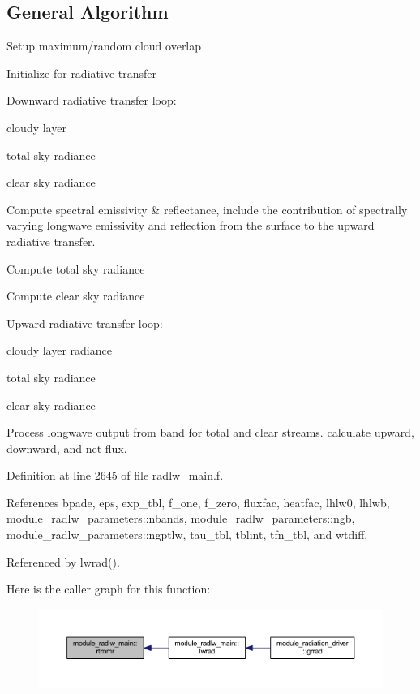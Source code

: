 \hypertarget{group__module__radsw__main_general}{}\subsection{General Algorithm}\label{group__module__radsw__main_general}

\begin{DoxyEnumerate}
\item Setup maximum/random cloud overlap
\item Initialize for radiative transfer
\item Downward radiative transfer loop\+:
\begin{DoxyItemize}
\item cloudy layer
\item total sky radiance
\item clear sky radiance
\end{DoxyItemize}
\item Compute spectral emissivity \& reflectance, include the contribution of spectrally varying longwave emissivity and reflection from the surface to the upward radiative transfer.
\item Compute total sky radiance
\item Compute clear sky radiance
\item Upward radiative transfer loop\+:
\begin{DoxyItemize}
\item cloudy layer radiance
\item total sky radiance
\item clear sky radiance
\end{DoxyItemize}
\item Process longwave output from band for total and clear streams. calculate upward, downward, and net flux. 
\end{DoxyEnumerate}

Definition at line 2645 of file radlw\+\_\+main.\+f.



References bpade, eps, exp\+\_\+tbl, f\+\_\+one, f\+\_\+zero, fluxfac, heatfac, lhlw0, lhlwb, module\+\_\+radlw\+\_\+parameters\+::nbands, module\+\_\+radlw\+\_\+parameters\+::ngb, module\+\_\+radlw\+\_\+parameters\+::ngptlw, tau\+\_\+tbl, tblint, tfn\+\_\+tbl, and wtdiff.



Referenced by lwrad().



Here is the caller graph for this function\+:
\nopagebreak
\begin{figure}[H]
\begin{center}
\leavevmode
\includegraphics[width=350pt]{group__module__radlw__main_gab0d2454aa5b29643b52fa31abe2f97b0_icgraph}
\end{center}
\end{figure}


